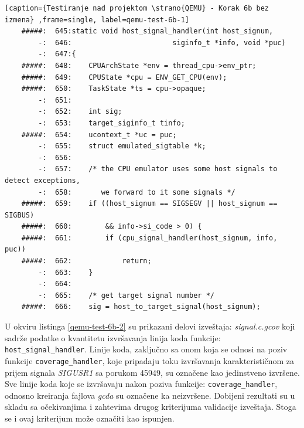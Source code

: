 \documentclass[12pt,oneside]{memoir}
\newcommand{\kod}[1]{\texttt{#1}}
\newcommand{\strano}[1]{\textit{#1}}
\begin{document}
\begin{lstlisting}[caption={Testiranje nad projektom \strano{QEMU} - Korak 6b bez izmena} ,frame=single, label=qemu-test-6b-1]
    #####:  645:static void host_signal_handler(int host_signum,
        -:  646:                        siginfo_t *info, void *puc)
        -:  647:{
    #####:  648:    CPUArchState *env = thread_cpu->env_ptr;
    #####:  649:    CPUState *cpu = ENV_GET_CPU(env);
    #####:  650:    TaskState *ts = cpu->opaque;
        -:  651:
        -:  652:    int sig;
        -:  653:    target_siginfo_t tinfo;
    #####:  654:    ucontext_t *uc = puc;
        -:  655:    struct emulated_sigtable *k;
        -:  656:
        -:  657:    /* the CPU emulator uses some host signals to detect exceptions,
        -:  658:       we forward to it some signals */
    #####:  659:    if ((host_signum == SIGSEGV || host_signum == SIGBUS)
    #####:  660:        && info->si_code > 0) {
    #####:  661:        if (cpu_signal_handler(host_signum, info, puc))
    #####:  662:            return;
        -:  663:    }
        -:  664:
        -:  665:    /* get target signal number */
    #####:  666:    sig = host_to_target_signal(host_signum);
\end{lstlisting}

U okviru listinga \ref{qemu-test-6b-2} su prikazani delovi izveštaja:
\strano{signal.c.gcov} koji sadrže podatke o kvantitetu izvršavanja linija koda funkcije: \kod{host\_signal\_handler}. Linije koda, zaključno sa onom koja se odnosi na poziv funkcije \kod{coverage\_handler}, koje pripadaju toku izvršavanja karakterističnom za prijem signala \strano{SIGUSR1} sa porukom  45949, su označene kao jedinstveno izvršene. Sve linije koda koje se izvršavaju nakon poziva funkcije: \kod{coverage\_handler}, odnosno kreiranja fajlova \strano{gcda} su označene ka neizvršene. Dobijeni rezultati su u skladu sa očekivanjima i zahtevima drugog kriterijuma validacije izveštaja. Stoga se i ovaj kriterijum može označiti kao ispunjen. 

\newpage
\end{document}

